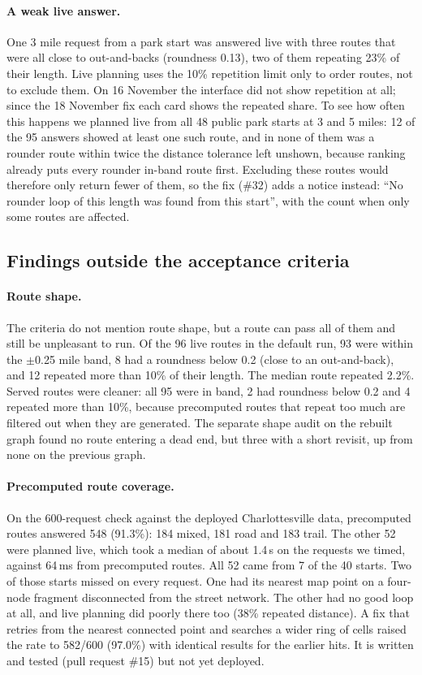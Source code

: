 \paragraph{A weak live answer.}
One 3 mile request from a park start was answered live with three routes
that were all close to out-and-backs (roundness 0.13), two of them repeating
23\% of their length. Live planning uses the 10\% repetition limit only to
order routes, not to exclude them. On 16 November the interface did not show
repetition at all; since the 18 November fix each card shows the repeated
share. To see how often this happens we planned live from all 48 public park
starts at 3 and 5 miles: 12 of the 95 answers showed at least one such route,
and in none of them was a rounder route within twice the distance tolerance
left unshown, because ranking already puts every rounder in-band route first.
Excluding these routes would therefore only return fewer of them, so the fix
(\#32) adds a notice instead: ``No rounder loop of this length was found
from this start'', with the count when only some routes are affected.

\subsection{Findings outside the acceptance criteria}
\paragraph{Route shape.}
The criteria do not mention route shape, but a route can pass all of them and
still be unpleasant to run. Of the 96 live routes in the default run, 93 were
within the $\pm$0.25 mile band, 8 had a roundness below 0.2 (close to an
out-and-back), and 12 repeated more than 10\% of their length. The median
route repeated 2.2\%. Served routes were cleaner: all 95 were in band, 2 had
roundness below 0.2 and 4 repeated more than 10\%, because precomputed routes
that repeat too much are filtered out when they are generated. The separate
shape audit on the rebuilt graph found no route entering a dead end, but
three with a short revisit, up from none on the previous graph.

\paragraph{Precomputed route coverage.}
On the 600-request check against the deployed Charlottesville data,
precomputed routes answered 548 (91.3\%): 184 mixed, 181 road and 183 trail.
The other 52 were planned live, which took a median of about 1.4\,s on the
requests we timed, against 64\,ms from precomputed routes. All 52
came from 7 of the 40 starts. Two of those starts missed on every request. One
had its nearest map point on a four-node fragment disconnected from the
street network. The other had no good loop at all, and live planning did
poorly there too (38\% repeated distance). A fix that retries from the nearest
connected point and searches a wider ring of cells raised the rate to
582/600 (97.0\%) with identical results for the earlier hits. It is written
and tested (pull request \#15) but not yet deployed.

